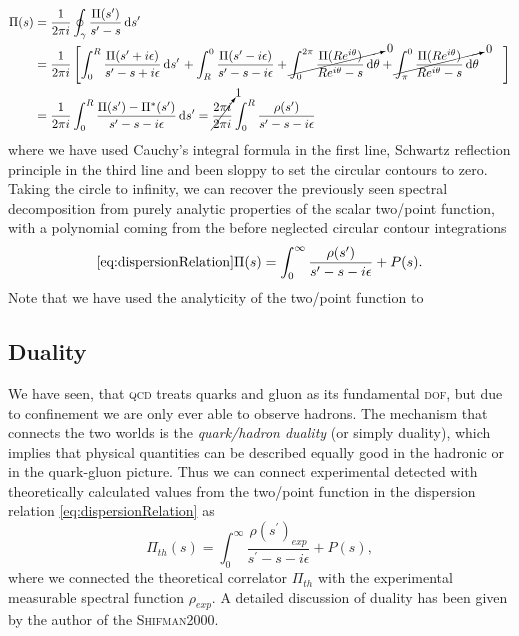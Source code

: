 \documentclass[../../index.tex]{subfiles}
\begin{document}
\begin{equation}
  \begin{split}
    \Pi(s) &= \frac{1}{2\pi i}\oint_\gamma \frac{\Pi(s^\prime)}{s^\prime-s} \dif s^\prime \\
    &= \frac{1}{2\pi i} \left[ \int_0^R
      \frac{\Pi(s^\prime+i\epsilon)}{s^\prime-s+i\epsilon}\dif s^\prime \right.
    + \int_R^0 \frac{\Pi(s^\prime - i\epsilon)}{s^\prime-s-i\epsilon} +
    \cancelto{0}{\int_0^{2\pi} \frac{\Pi(R e^{i\theta})}{Re^{i\theta}-s}\dif
      \theta}
    + \cancelto{0}{ \int_\pi^0 \frac{\Pi(R e^{i\theta})}{Re^{i\theta}-s}\dif \theta} \left. \phantom{\int_0^R} \right] \\
    &= \frac{1}{2\pi i}\int_0^R \frac{\Pi(s^\prime) -
      \Pi^*(s^\prime)}{s^\prime-s-i\epsilon} \dif s^\prime =
    \cancelto{1}{\frac{2 \pi i}{2 \pi i}}\int_0^R
    \frac{\rho(s^\prime)}{s^\prime-s-i\epsilon}
  \end{split}
\end{equation}
where we have used Cauchy's integral formula in the first line, Schwartz
reflection principle in the third line and been sloppy to set the circular
contours to zero. Taking the circle to infinity, we can recover the previously
seen spectral decomposition from purely analytic properties of the scalar
two\-/point function, with a polynomial coming from the before neglected
circular contour integrations
\begin{equation}
  \cref{eq:dispersionRelation}
  \Pi(s) = \int_0^\infty \frac{\rho(s^\prime)}{s^\prime-s-i\epsilon} + P(s).
\end{equation}
Note that we have used the analyticity of the two\-/point function to

\subsection{Duality}
We have seen, that \textsc{qcd} treats quarks and gluon as its fundamental
\textsc{dof}, but due to confinement we are only ever able to observe hadrons.
The mechanism that connects the two worlds is the \textit{quark\-/hadron
  duality} (or simply duality), which implies that physical quantities can be
described equally good in the hadronic or in the quark-gluon picture. Thus we
can connect experimental detected with theoretically calculated values from the
two\-/point function in the dispersion relation \cref{eq:dispersionRelation} as
\begin{equation}
  \Pi_{th}(s) = \int_0^\infty \frac{\rho(s^\prime)_{exp}}{s^\prime-s-i\epsilon} + P(s),
\end{equation}
where we connected the theoretical correlator $\Pi_{th}$ with the experimental
measurable spectral function $\rho_{exp}$. A detailed discussion of duality has
been given by the author of the \textsc{Shifman2000}.
\end{document}
